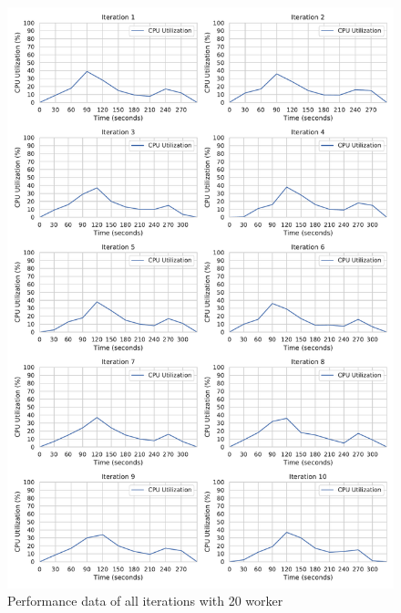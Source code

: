 \begin{figure}[h]
\centering
\includegraphics[scale=0.4]{images/07_evaluation/regression/20_worker_cpu_performance}
\caption{Performance data of all iterations with 20 worker}
\label{fig:appendix_eval_regression_static20}
\end{figure}


